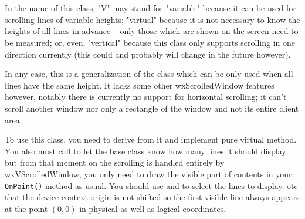 
\section{}\label{wxvscrolledwindow}

In the name of this class, "V" may stand for "variable" because it can be
used for scrolling lines of variable heights; "virtual" because it is not
necessary to know the heights of all lines in advance -- only those which
are shown on the screen need to be measured; or, even, "vertical" because
this class only supports scrolling in one direction currently (this could
and probably will change in the future however).

In any case, this is a generalization of the 
 class which can be only used when
all lines have the same height. It lacks some other wxScrolledWindow features
however, notably there is currently no support for horizontal scrolling; it
can't scroll another window nor only a rectangle of the window and not its
entire client area.
 
To use this class, you need to derive from it and implement 
 pure virtual
method. You also must call  
to let the base class know how many lines it should display but from that
moment on the scrolling is handled entirely by wxVScrolledWindow, you only
need to draw the visible part of contents in your {\tt OnPaint()} method as
usual. You should use  
and  to
select the lines to display. ote that the device context origin is not shifted
so the first visible line always appears at the point $(0, 0)$ in physical as
well as logical coordinates.




